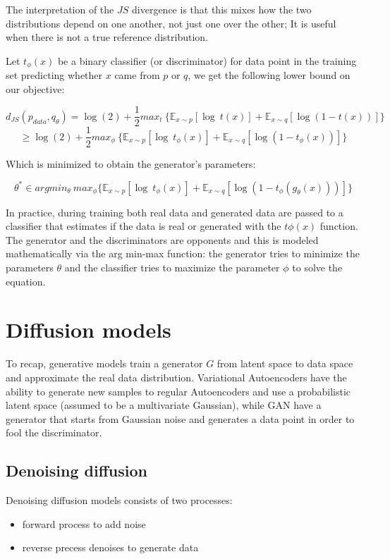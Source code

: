 \documentclass[11pt]{article}
\begin{document}
The interpretation of the \(JS\) divergence is that this mixes how the
two distributions depend on one another, not just one over the other; It
is useful when there is not a true reference distribution.

Let \(t_\phi (x)\) be a binary classifier (or discriminator) for data
point in the training set predicting whether \(x\) came from \(p\) or
\(q\), we get the following lower bound on our objective:

\[d_{JS}(p_{data}, q_\theta)=\log(2)+\frac{1}{2}max_t\ \{ \mathbb{E}_{x\sim p}[\log\ t(x)] + \mathbb{E}_{x\sim q}[\log(1-t(x))] \}\]
\[\ge \log(2)+\frac{1}{2}max_\phi \ \{ \mathbb{E}_{x\sim p}[\log\ t_\phi(x)] + \mathbb{E}_{x\sim q}[\log(1-t_\phi(x))] \}\]

Which is minimized to obtain the generator's parameters:

\[\theta^* \in argmin_\theta\ max_\phi \{ \mathbb{E}_{x\sim p}[\log\ t_\phi(x)] + \mathbb{E}_{x\sim q}[\log(1-t_\phi(g_{\theta}(x)))] \}\]

In practice, during training both real data and generated data are
passed to a classifier that estimates if the data is real or generated
with the \(t\phi(x)\) function. The generator and the discriminators are
opponents and this is modeled mathematically via the arg min-max
function: the generator tries to minimize the parameters \(\theta\) and
the classifier tries to maximize the parameter \(\phi\) to solve the
equation.

\section{Diffusion models}\label{diffusion-models}

To recap, generative models train a generator \(G\) from latent space to
data space and approximate the real data distribution. Variational
Autoencoders have the ability to generate new samples to regular
Autoencoders and use a probabilistic latent space (assumed to be a
multivariate Gaussian), while GAN have a generator that starts from
Gaussian noise and generates a data point in order to fool the
discriminator.

\subsection{Denoising diffusion}\label{denoising-diffusion}

Denoising diffusion models consists of two processes:

\begin{itemize}
\tightlist
\item
  forward process to add noise
\item
  reverse precess denoises to generate data
\end{itemize}
\end{document}
